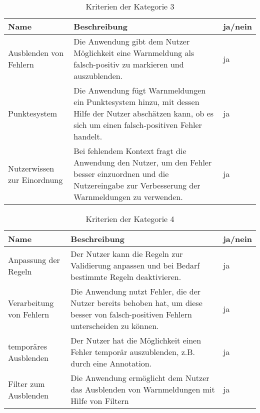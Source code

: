 \begin{table}[htp]
    \centering
    \begin{tabularx}{\columnwidth}{lXl}
        \toprule
        \textbf{Name}               & \textbf{Beschreibung}                                                                                                                                         & \textbf{ja/nein} \\
        \midrule
        Ausblenden von Fehlern      & Die Anwendung gibt dem Nutzer Möglichkeit eine Warnmeldung als falsch-positiv zu markieren und auszublenden.                                                  & ja               \\
        \midrule
        Punktesystem                & Die Anwendung fügt Warnmeldungen ein Punktesystem hinzu, mit dessen Hilfe der Nutzer abschätzen kann, ob es sich um einen falsch-positiven Fehler handelt.    & ja               \\
        \midrule
        Nutzerwissen zur Einordnung & Bei fehlendem Kontext fragt die Anwendung den Nutzer, um den Fehler besser einzuordnen und die Nutzereingabe zur Verbesserung der Warnmeldungen zu verwenden. & ja               \\
        \bottomrule
    \end{tabularx}
    \caption{Kriterien der Kategorie 3}
    \label{tbl:criteria-category-3}
\end{table}


\begin{table}[htp]
    \centering
    \begin{tabularx}{\columnwidth}{lXl}
        \toprule
        \textbf{Name}            & \textbf{Beschreibung}                                                                                                                 & \textbf{ja/nein} \\
        \midrule
        Anpassung der Regeln     & Der Nutzer kann die Regeln zur Validierung anpassen und bei Bedarf bestimmte Regeln deaktivieren.                                     & ja               \\
        \midrule
        Verarbeitung von Fehlern & Die Anwendung nutzt Fehler, die der Nutzer bereits behoben hat, um diese besser von falsch-positiven Fehlern unterscheiden zu können. & ja               \\
        \midrule
        temporäres Ausblenden    & Der Nutzer hat die Möglichkeit einen Fehler temporär auszublenden, z.B. durch eine Annotation.                                        & ja               \\
        \midrule
        Filter zum Ausblenden    & Die Anwendung ermöglicht dem Nutzer das Ausblenden von Warnmeldungen mit Hilfe von Filtern                                            & ja               \\
        \bottomrule
    \end{tabularx}
    \caption{Kriterien der Kategorie 4}
    \label{tbl:criteria-category-4}
\end{table}

